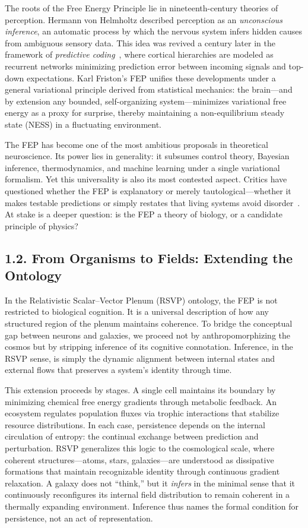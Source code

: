 \documentclass[12pt,a4paper]{article}
\begin{document}
The roots of the Free Energy Principle lie in nineteenth-century theories of perception.  
Hermann von Helmholtz described perception as an \emph{unconscious inference}, an automatic process by which the nervous system infers hidden causes from ambiguous sensory data.  
This idea was revived a century later in the framework of \emph{predictive coding}~\citep{rao1999predictive}, where cortical hierarchies are modeled as recurrent networks minimizing prediction error between incoming signals and top-down expectations.  
Karl Friston’s FEP unifies these developments under a general variational principle derived from statistical mechanics: the brain—and by extension any bounded, self-organizing system—minimizes variational free energy as a proxy for surprise, thereby maintaining a non-equilibrium steady state (NESS) in a fluctuating environment.

The FEP has become one of the most ambitious proposals in theoretical neuroscience.  
Its power lies in generality: it subsumes control theory, Bayesian inference, thermodynamics, and machine learning under a single variational formalism.  
Yet this universality is also its most contested aspect.  
Critics have questioned whether the FEP is explanatory or merely tautological—whether it makes testable predictions or simply restates that living systems avoid disorder~\citep{baltieri2020william,friston2019free}.  
At stake is a deeper question: is the FEP a theory of biology, or a candidate principle of physics?

\subsection{1.2. From Organisms to Fields: Extending the Ontology}

In the Relativistic Scalar–Vector Plenum (RSVP) ontology, the FEP is not restricted to biological cognition.  
It is a universal description of how any structured region of the plenum maintains coherence.  
To bridge the conceptual gap between neurons and galaxies, we proceed not by anthropomorphizing the cosmos but by stripping inference of its cognitive connotation.  
Inference, in the RSVP sense, is simply the dynamic alignment between internal states and external flows that preserves a system’s identity through time.

This extension proceeds by stages.  
A single cell maintains its boundary by minimizing chemical free energy gradients through metabolic feedback.  
An ecosystem regulates population fluxes via trophic interactions that stabilize resource distributions.  
In each case, persistence depends on the internal circulation of entropy: the continual exchange between prediction and perturbation.  
RSVP generalizes this logic to the cosmological scale, where coherent structures—atoms, stars, galaxies—are understood as dissipative formations that maintain recognizable identity through continuous gradient relaxation.  
A galaxy does not “think,” but it \emph{infers} in the minimal sense that it continuously reconfigures its internal field distribution to remain coherent in a thermally expanding environment.  
Inference thus names the formal condition for persistence, not an act of representation.
\end{document}
